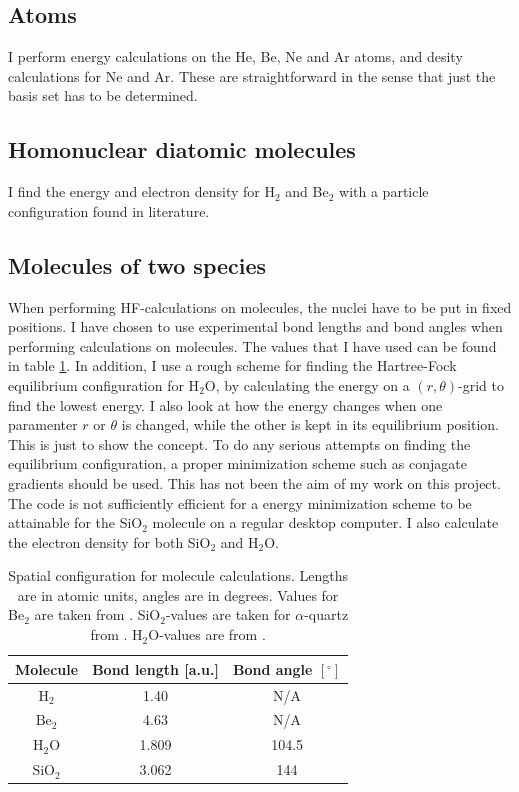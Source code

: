 \documentclass[a4paper,10pt, twocolumn, pre]{revtex4}
\begin{document}
\subsection{Atoms}
I perform energy calculations on the He, Be, Ne and Ar atoms, and desity calculations for Ne and Ar. These are straightforward in the sense that just the basis set has to be determined. 

\subsection{Homonuclear diatomic molecules}
I find the energy and electron density for H$_2$ and Be$_2$ with a particle configuration found in literature. 

\subsection{Molecules of two species}
When performing HF-calculations on molecules, the nuclei have to be put in fixed positions. I have chosen to use experimental bond lengths and bond angles when performing calculations on molecules. The values that I have used can be found in table \ref{tb:configuration}. In addition, I use a rough scheme for finding the Hartree-Fock equilibrium configuration for H$_2$O, by calculating the energy on a $(r, \theta)$-grid to find the lowest energy. I also look at how the energy changes when one paramenter $r$ or $\theta$ is changed, while the other is kept in its equilibrium position. This is just to show the concept. To do any serious attempts on finding the equilibrium configuration, a proper minimization scheme such as conjagate gradients should be used. This has not been the aim of my work on this project. The code is not sufficiently efficient for a energy minimization scheme to be attainable for the SiO$_2$ molecule on a regular desktop computer. I also calculate the electron density for both SiO$_2$ and H$_2$O.



\begin{table}
\caption{Spatial configuration for molecule calculations. Lengths are in atomic units, angles are in degrees. Values for Be$_2$ are taken from \cite{hogberget2013quantum}. SiO$_2$-values are taken for $\alpha$-quartz from \cite{wiberg2001holleman}. H$_2$O-values are from \cite{thijssen2007computational}.}
\label{tb:configuration}
\begin{tabular}[c]{c|c|c}
Molecule & Bond length [a.u.] & Bond angle $[^{\circ}]$ \\
\hline
$\mbox{H}_2$ & 1.40 & N/A \\
$\mbox{Be}_2$ & 4.63 & N/A \\
$\mbox{H}_2\mbox{O}$ & 1.809 & 104.5 \\
$\mbox{SiO}_2$ & 3.062 & 144 \\
\end{tabular}
\end{table}  
\end{document}
